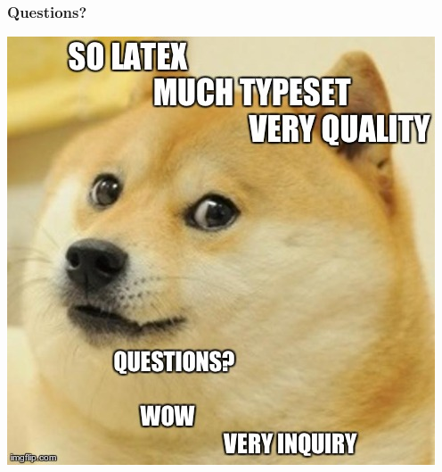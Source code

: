 \documentclass[notes=only]{beamer}
\begin{document}
\begin{frame} \frametitle{Questions?}
\begin{center}
    \includegraphics[width=.7\textwidth]{Resources/doge.jpg}
    \end{center}
\end{frame}
\end{document}
